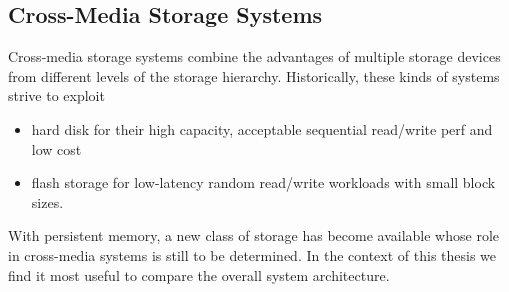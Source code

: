 \documentclass[12pt,a4paper,twoside,draft]{book}
\begin{document}
\subsection{Cross-Media Storage Systems}\label{sec:cross_media_storage_systems}
Cross-media storage systems combine the advantages of multiple storage devices from different levels of the storage hierarchy.
Historically, these kinds of systems strive to exploit
\begin{itemize}
    \item hard disk for their high capacity, acceptable sequential read/write perf and low cost
    \item flash storage for low-latency random read/write workloads with small block sizes.
\end{itemize}
With persistent memory, a new class of storage has become available whose role in cross-media systems is still to be determined.
In the context of this thesis we find it most useful to compare the overall system architecture.
\end{document}
